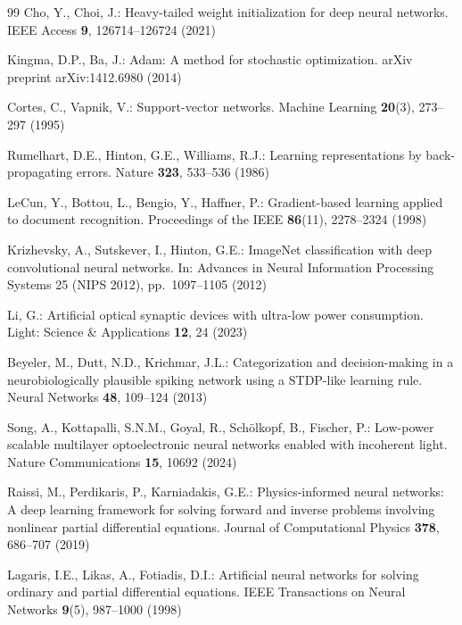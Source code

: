 \documentclass[pdflatex,sn-mathphys-num]{sn-jnl}%
\theoremstyle{thmstyleone}%
\theoremstyle{thmstyletwo}%
\theoremstyle{thmstylethree}%
\begin{document}
{\begin{thebibliography}{99}
Cho, Y., Choi, J.: Heavy-tailed weight initialization for deep neural networks. IEEE Access \textbf{9}, 126714--126724 (2021)

Kingma, D.P., Ba, J.: Adam: A method for stochastic optimization. arXiv preprint arXiv:1412.6980 (2014)

Cortes, C., Vapnik, V.: Support-vector networks. Machine Learning \textbf{20}(3), 273--297 (1995)

Rumelhart, D.E., Hinton, G.E., Williams, R.J.: Learning representations by back-propagating errors. Nature \textbf{323}, 533--536 (1986)

LeCun, Y., Bottou, L., Bengio, Y., Haffner, P.: Gradient-based learning applied to document recognition. Proceedings of the IEEE \textbf{86}(11), 2278--2324 (1998)

Krizhevsky, A., Sutskever, I., Hinton, G.E.: ImageNet classification with deep convolutional neural networks. In: Advances in Neural Information Processing Systems 25 (NIPS 2012), pp.~1097--1105 (2012)

Li, G.: Artificial optical synaptic devices with ultra-low power consumption. Light: Science \& Applications \textbf{12}, 24 (2023)

Beyeler, M., Dutt, N.D., Krichmar, J.L.: Categorization and decision-making in a neurobiologically plausible spiking network using a STDP-like learning rule. Neural Networks \textbf{48}, 109--124 (2013)

Song, A., Kottapalli, S.N.M., Goyal, R., Sch\"{o}lkopf, B., Fischer, P.: Low-power scalable multilayer optoelectronic neural networks enabled with incoherent light. Nature Communications \textbf{15}, 10692 (2024)

Raissi, M., Perdikaris, P., Karniadakis, G.E.: Physics-informed neural networks: A deep learning framework for solving forward and inverse problems involving nonlinear partial differential equations. Journal of Computational Physics \textbf{378}, 686--707 (2019)

Lagaris, I.E., Likas, A., Fotiadis, D.I.: Artificial neural networks for solving ordinary and partial differential equations. IEEE Transactions on Neural Networks \textbf{9}(5), 987--1000 (1998)


\end{thebibliography}}
\end{document}
